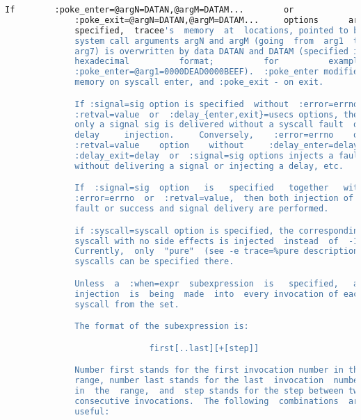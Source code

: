{{\begin{lstlisting}[language=bash]
              If        :poke_enter=@argN=DATAN,@argM=DATAM...        or
              :poke_exit=@argN=DATAN,@argM=DATAM...     options      are
              specified,  tracee's  memory  at  locations, pointed to by
              system call arguments argN and argM (going  from  arg1  to
              arg7) is overwritten by data DATAN and DATAM (specified in
              hexadecimal          format;          for          example
              :poke_enter=@arg1=0000DEAD0000BEEF).  :poke_enter modifies
              memory on syscall enter, and :poke_exit - on exit.

              If :signal=sig option is specified  without  :error=errno,
              :retval=value  or  :delay_{enter,exit}=usecs options, then
              only a signal sig is delivered without a syscall fault  or
              delay     injection.     Conversely,    :error=errno    or
              :retval=value    option    without     :delay_enter=delay,
              :delay_exit=delay  or  :signal=sig options injects a fault
              without delivering a signal or injecting a delay, etc.

              If  :signal=sig  option   is   specified   together   with
              :error=errno  or  :retval=value,  then both injection of a
              fault or success and signal delivery are performed.

              if :syscall=syscall option is specified, the corresponding
              syscall with no side effects is injected  instead  of  -1.
              Currently,  only  "pure"  (see -e trace=%pure description)
              syscalls can be specified there.

              Unless  a  :when=expr  subexpression  is   specified,   an
              injection  is  being  made  into  every invocation of each
              syscall from the set.

              The format of the subexpression is:

                             first[..last][+[step]]

              Number first stands for the first invocation number in the
              range, number last stands for the last  invocation  number
              in  the  range,  and  step stands for the step between two
              consecutive invocations.  The following  combinations  are
              useful:


\end{lstlisting}}}
